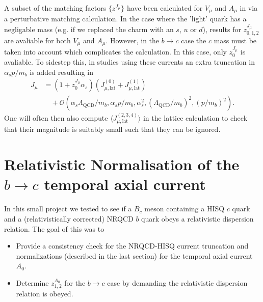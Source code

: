 A subset of the matching factors $\{z^{J_{\mu}}\}$ have been calculated for $V_{\mu}$ and $A_{\mu}$ in \cite{Monahan:2012dq} via a perturbative matching calculation. In the case where the 'light' quark has a negligable mass (e.g. if we replaced the charm with an $s$, $u$ or $d$), results for $z^{J_{\mu}}_{0,1,2}$ are avaliable for both $V_{\mu}$ and $A_{\mu}$. However, in the $b\to c$ case the $c$ mass must be taken into account which complicates the calculation. In this case, only $z^{J_{\mu}}_{0}$ is avaliable. To sidestep this, in studies using these currents an extra truncation in $\alpha_s p/m_b$ is added resulting in
\begin{align}
  J_{\mu} &= ( 1 + z^{J_{\mu}}_0 \alpha_s )( J_{\mu,\text{lat}}^{(0)} + J_{\mu,\text{lat}}^{(1)} ) \\ \nonumber &\quad + \mathcal{O}( \alpha_s \Lambda_{\text{QCD}} / m_b, \alpha_s p/m_b,  \alpha_s^2, (\Lambda_{\text{QCD}}/m_b)^2, (p/m_b)^2 ).
\end{align}
One will often then also compute $\langle J_{\mu,\text{lat}}^{(2,3,4)}\rangle$ in the lattice calculation to check that their magnitude is suitably small such that they can be ignored.

\section{Relativistic Normalisation of the $b\to c$ temporal axial current}
\label{sec:relativistic}

In this small project we tested to see if a $B_c$ meson containing a HISQ $c$ quark and a (relativistically corrected) NRQCD $b$ quark obeys a relativistic dispersion relation. The goal of this was to
\begin{itemize}
\item
  Provide a consistency check for the NRQCD-HISQ current truncation and normalizations (described in the last section) for the temporal axial current $A_0$.
\item
  Determine $z^{A_0}_{1,2}$ for the $b\to c$ case by demanding the relativistic dispersion relation is obeyed.
\end{itemize}

